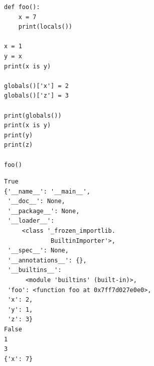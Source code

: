\begin{frame}[fragile]
%
\begin{tcbraster}[raster columns=2,
                  raster equal height,
                  nobeforeafter,
                  raster column skip=0.2cm]
\begin{codebox}
\begin{verbatim}
def foo():
    x = 7
    print(locals())
    
x = 1
y = x
print(x is y)

globals()['x'] = 2
globals()['z'] = 3

print(globals())
print(x is y)
print(y)
print(z)

foo()
\end{verbatim}
\end{codebox}
%
\begin{cmdbox}
\begin{verbatim}
True
{'__name__': '__main__', 
 '__doc__': None, 
 '__package__': None, 
 '__loader__': 
     <class '_frozen_importlib.
             BuiltinImporter'>, 
 '__spec__': None, 
 '__annotations__': {}, 
 '__builtins__':
      <module 'builtins' (built-in)>, 
 'foo': <function foo at 0x7ff7d027e0e0>, 
 'x': 2, 
 'y': 1, 
 'z': 3}
False
1
3
{'x': 7}
\end{verbatim}
\end{cmdbox}
\end{tcbraster}
%
\end{frame}


